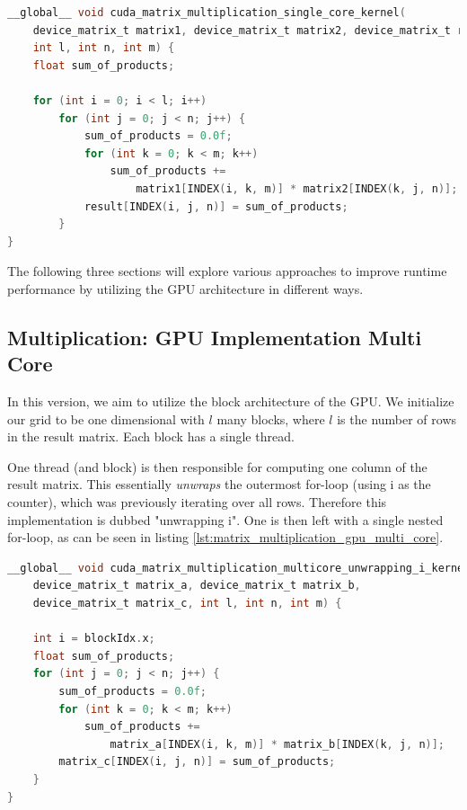 \begin{lstlisting}[language=C, caption={Matrix Multiplication on the gpu}, label={lst:matrix_multiplication_gpu}]
__global__ void cuda_matrix_multiplication_single_core_kernel(
    device_matrix_t matrix1, device_matrix_t matrix2, device_matrix_t result,
    int l, int n, int m) {
    float sum_of_products;

    for (int i = 0; i < l; i++)
        for (int j = 0; j < n; j++) {
            sum_of_products = 0.0f;
            for (int k = 0; k < m; k++)
                sum_of_products +=
                    matrix1[INDEX(i, k, m)] * matrix2[INDEX(k, j, n)];
            result[INDEX(i, j, n)] = sum_of_products;
        }
}
\end{lstlisting}

The following three sections will explore various approaches to improve runtime performance by utilizing the GPU architecture in different ways. %

\subsection{Multiplication: GPU Implementation Multi Core}


In this version, we aim to utilize the block architecture of the GPU. We initialize our grid to be one dimensional with $l$ many blocks, where $l$ is the number of rows in the result matrix. Each block has a single thread.

One thread (and block) is then responsible for computing one column of the result matrix. This essentially \textit{unwraps} the outermost for-loop (using i as the counter), which was previously iterating over all rows. Therefore this implementation is dubbed "unwrapping i". One is then left with a single nested for-loop, as can be seen in listing \ref{lst:matrix_multiplication_gpu_multi_core}.

\begin{lstlisting}[language=C, caption={Multi Core Matrix Multiplication}, label={lst:matrix_multiplication_gpu_multi_core}]
__global__ void cuda_matrix_multiplication_multicore_unwrapping_i_kernel(
    device_matrix_t matrix_a, device_matrix_t matrix_b,
    device_matrix_t matrix_c, int l, int n, int m) {

    int i = blockIdx.x;
    float sum_of_products;
    for (int j = 0; j < n; j++) {
        sum_of_products = 0.0f;
        for (int k = 0; k < m; k++)
            sum_of_products +=
                matrix_a[INDEX(i, k, m)] * matrix_b[INDEX(k, j, n)];
        matrix_c[INDEX(i, j, n)] = sum_of_products;
    }
}
\end{lstlisting}

